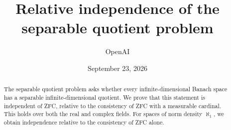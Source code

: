 \documentclass[11pt]{article}
\title{Relative independence of the separable quotient problem}
\author{OpenAI}
\date{September 23, 2026}
\theoremstyle{definition}
\begin{document}
\maketitle
\begin{abstract}
The separable quotient problem asks whether every infinite-dimensional Banach
space has a separable infinite-dimensional quotient. We prove that this
statement is independent of ZFC, relative to the consistency of ZFC with a
measurable cardinal. This holds over both the real and complex fields. For
spaces of norm density $\aleph_1$, we obtain independence relative to the
consistency of ZFC alone.
\end{abstract}
\setcounter{tocdepth}{1}
\tableofcontents
\clearpage












\end{document}
